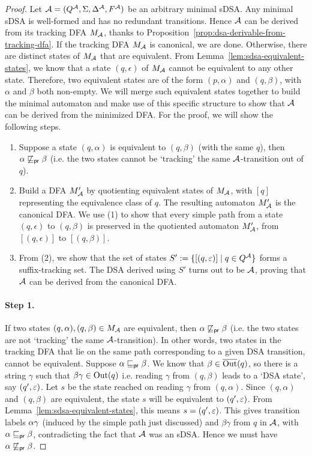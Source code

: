 \begin{proof}

  Let $\mathcal{A} = (Q^{\mathcal{A}}, \Sigma, \Delta^{\mathcal{A}}, F^{\mathcal{A}})$ be an arbitrary minimal sDSA.
Any minimal sDSA is well-formed and has no redundant transitions. Hence $\mathcal{A}$ can be derived from its tracking DFA $M_{\mathcal{A}}$, thanks to Proposition~\ref{prop:dsa-derivable-from-tracking-dfa}. If the tracking DFA $M_{\mathcal{A}}$ is canonical, we are done. Otherwise, there are distinct states of $M_{\mathcal{A}}$ that are equivalent.  From Lemma~\ref{lem:sdsa-equivalent-states}, we know that a state $(q, \epsilon)$ of $M_{\mathcal{A}}$ cannot be equivalent to any other state. Therefore,  two equivalent states are of the form $(p, \alpha)$ and $(q, \beta)$, with $\alpha$ and $\beta$ both non-empty. We will merge such equivalent states together to build the minimal automaton and make use of this specific structure to show that $\mathcal{A}$ can be derived from the minimized DFA. For the proof, we will show the following steps.
\begin{enumerate}
\item Suppose a state $(q, \alpha)$ is equivalent to $(q, \beta)$ (with the same $q$), then $\alpha \not \sqsubseteq_{\mathsf {pr}} \beta$ (i.e. the two states cannot be `tracking' the same $\mathcal{A}$-transition out of $q$).
\item Build a DFA $M'_{\mathcal{A}}$ by quotienting equivalent states of $M_{\mathcal{A}}$, with $[q]$ representing the equivalence class of $q$. The resulting automaton $M'_{\mathcal{A}}$ is the canonical DFA. We use (1) to show that every simple path from a state $(q, \epsilon)$ to $(q, \beta)$ is preserved in the quotiented automaton $M'_{\mathcal{A}}$, from $[(q, \epsilon)]$ to $[(q, \beta)]$.
\item From (2), we show that the set of states $S' := \{ [(q, \varepsilon)] \mid q \in Q^{\mathcal{A}}\}$ forms a suffix-tracking set. The DSA derived using $S'$ turns out to be $\mathcal{A}$, proving that $\mathcal{A}$ can be derived from the canonical DFA.
\end{enumerate}

\paragraph*{Step 1.} If two states $(q,\alpha),(q,\beta) \in M_{\mathcal{A}}$ are equivalent, then $\alpha\not\sqsubseteq_{\mathsf {pr}}\beta$ (i.e. the two states are not `tracking' the same $\mathcal{A}$-transition). In other words, two states in the tracking DFA that lie on the same path corresponding to a given DSA transition, cannot be equivalent. Suppose $\alpha\sqsubseteq_{\mathsf {pr}}\beta$. We know that $\beta\in\overline{\operatorname{Out}}(q)$, so there is a string $\gamma$ such that $\beta\gamma\in\operatorname{Out}(q)$ i.e. reading $\gamma$ from $(q,\beta)$ leads to a `DSA state', say $(q',\varepsilon)$. Let $s$ be the state reached on reading $\gamma$ from $(q, \alpha)$. Since $(q, \alpha)$ and $(q, \beta)$ are equivalent, the state $s$ will be equivalent to $(q', \varepsilon)$. From Lemma~\ref{lem:sdsa-equivalent-states}, this means $s = (q', \varepsilon)$. This gives transition labels $\alpha\gamma$ (induced by the simple path just discussed) and $\beta\gamma$ from $q$ in $\mathcal{A}$, with $\alpha\sqsubseteq_{\mathsf {pr}}\beta$, contradicting the fact that $\mathcal{A}$ was an sDSA. Hence we must have $\alpha\not\sqsubseteq_{\mathsf {pr}}\beta$.


\end{proof}
